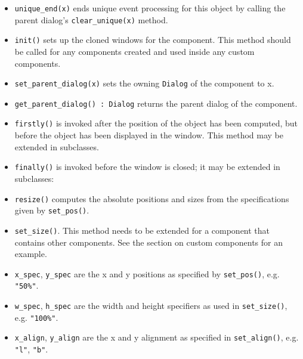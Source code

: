 \begin{itemize}
\item\noindent\texttt{unique\_end(x)} ends unique event processing for this object by calling
the parent dialog's \texttt{clear\_unique(x)} method.

\item\noindent\texttt{init()} sets up the cloned windows for the component. This method should
be called for any components created and used inside any custom
components.

\item\noindent\texttt{set\_parent\_dialog(x)} sets the owning \texttt{Dialog} of the component to
x.

\item\noindent\texttt{get\_parent\_dialog() : Dialog} returns the parent dialog of the
component.

\item\noindent\texttt{firstly()} is invoked after the position of the object has been
computed,
but before the object has been displayed in the window. This method may
be extended in subclasses.

\item\noindent\texttt{finally()} is invoked before the window is closed; it may
be extended in subclasses:


\item\noindent\texttt{resize()} computes the absolute positions and sizes from the
specifications given by \texttt{set\_pos()}.

\item\noindent\texttt{set\_size()}. This method needs
to be extended for a component that contains other components. See the
section on custom components for an example.

\item\noindent\texttt{x\_spec}, \texttt{y\_spec} are the x and y positions as specified by \texttt{set\_pos()},
e.g. \texttt{"50\%"}.

\item\noindent\texttt{w\_spec}, \texttt{h\_spec} are the width and height specifiers
as used in \texttt{set\_size()}, e.g. \texttt{"100\%"}.

\item\noindent\texttt{x\_align}, \texttt{y\_align} are the x and y alignment as specified in
\texttt{set\_align()}, e.g. \texttt{"l"}, \texttt{"b"}.
\end{itemize}

